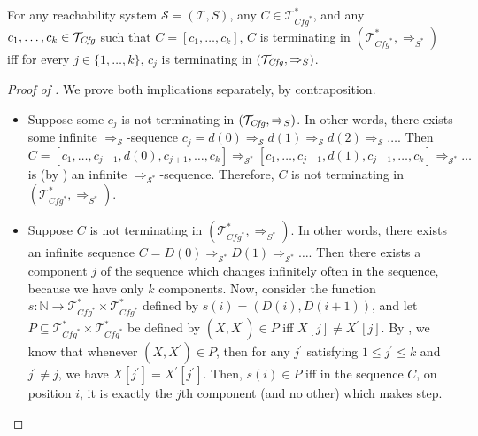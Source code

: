 \begin{lemma}\label{lem:terminationComposite}
    For any reachability system $\mathcal{S} = (\mathcal{T}, S)$, any $C \in \mathcal{T}^*_{\mathit{Cfg}^*}$,
    and any $c_1,\ldots,c_k \in \mathcal{T}_{\mathit{Cfg}}$ such that
    $C = [c_1,\ldots,c_k]$, $C$ is terminating in $(\mathcal{T}^*_{\mathit{Cfg}^*}, \Rightarrow_{S^*})$
    iff for every $j \in \{ 1, \ldots, k \}$, $c_j$ is terminating in $(\mathcal{T}_{\mathit{Cfg}}, \Rightarrow_S)$.
\end{lemma}
\begin{proof}[Proof of ]
We prove both implications separately, by contraposition.
\begin{itemize}
    \item Suppose some $c_j$ is not terminating in $(\mathcal{T}_{\mathit{Cfg}}, \Rightarrow_S)$.
    In other words, there exists some infinite $\Rightarrow_{\mathcal{S}}$-sequence
    $c_j = d(0) \Rightarrow_{\mathcal{S}} d(1) \Rightarrow_{\mathcal{S}} d(2) \Rightarrow_{\mathcal{S}} \ldots$.
    Then
    \begin{equation*}
        C = [c_1,\ldots,c_{j-1}, d(0), c_{j+1}, \ldots, c_k] \Rightarrow_{\mathcal{S}^*}
        [c_1,\ldots,c_{j-1}, d(1), c_{j+1}, \ldots, c_k] \Rightarrow_{\mathcal{S}^*} \ldots
    \end{equation*}
    is (by ) an infinite $\Rightarrow_{\mathcal{S}^*}$-sequence.
    Therefore, $C$ is not terminating in $(\mathcal{T}^*_{\mathit{Cfg}^*}, \Rightarrow_{S^*})$.
    \item Suppose $C$ is not terminating in $(\mathcal{T}^*_{\mathit{Cfg}^*}, \Rightarrow_{S^*})$.
    In other words, there exists an infinite sequence $C = D(0) \Rightarrow_{\mathcal{S}^*} D(1) \Rightarrow_{\mathcal{S}^*} \ldots$.
    Then there exists a component $j$ of the sequence which changes infinitely often in the sequence,
    because we have only $k$ components.
    Now, consider the function $s : \mathbb{N} \to \mathcal{T}^*_{\mathit{Cfg}^*} \times \mathcal{T}^*_{\mathit{Cfg}^*}$
    defined by $s(i) = (D(i), D(i+1))$, and let $P \subseteq \mathcal{T}^*_{\mathit{Cfg}^*} \times \mathcal{T}^*_{\mathit{Cfg}^*}$
    be defined by $(X, X^\prime) \in P$ iff $X[j] \not = X^\prime[j]$.
    By , we know that whenever $(X, X^\prime) \in P$,
    then for any $j^\prime$ satisfying $1 \leq j^\prime \leq k$ and $j^\prime \not = j$,
    we have $X[j^\prime] = X^\prime[j^\prime]$.
    Then, $s(i) \in P$ iff in the sequence $C$, on position $i$, it is exactly the $j$th component (and no other)
    which makes step.

\end{itemize}
\end{proof}
